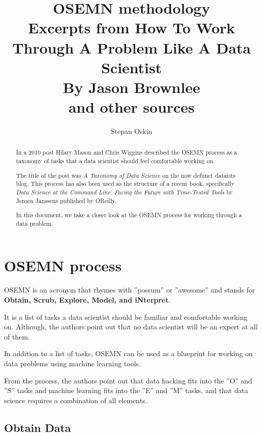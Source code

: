 \documentclass[11pt]{article}
\begin{document}
    \title{OSEMN methodology\\
    Excerpts from How To Work Through A Problem Like A Data Scientist \\
    By Jason Brownlee\cite{Brownlee2014} \\
    and other sources}


    \author{Stepan Oskin}

    \maketitle

    \begin{abstract}

    In a 2010 post Hilary Mason and Chris Wiggins described the OSEMN process as a taxonomy of tasks that a data scientist should feel comfortable working on.

    The title of the post was \textit{A Taxonomy of Data Science} on the now defunct dataists blog\cite{Mason2010}.
    This process has also been used as the structure of a recent book, specifically \textit{Data Science at the Command Line: Facing the Future with Time-Tested Tools} by Jeroen Janssens published by O\’Reilly\cite{Janssens}.

    In this document, we take a closer look at the OSEMN process for working through a data problem.
    \end{abstract}

    \section{OSEMN process} \label{sec:osemn}
    OSEMN is an acronym that rhymes with ''possum'' or ''awesome'' and stands for \textbf{Obtain, Scrub, Explore, Model, and iNterpret}.

    It is a list of tasks a data scientist should be familiar and comfortable working on.
    Although, the authors point out that no data scientist will be an expert at all of them.

    In addition to a list of tasks, OSEMN can be used as a blueprint for working on data problems using machine learning tools.

    From the process, the authors point out that data hacking fits into the ''O'' and ''S'' tasks and machine learning fits into the ''E'' and ''M'' tasks, and that data science requires a combination of all elements.

    \subsection{Obtain Data} \label{subsec:obtain}
\end{document}
